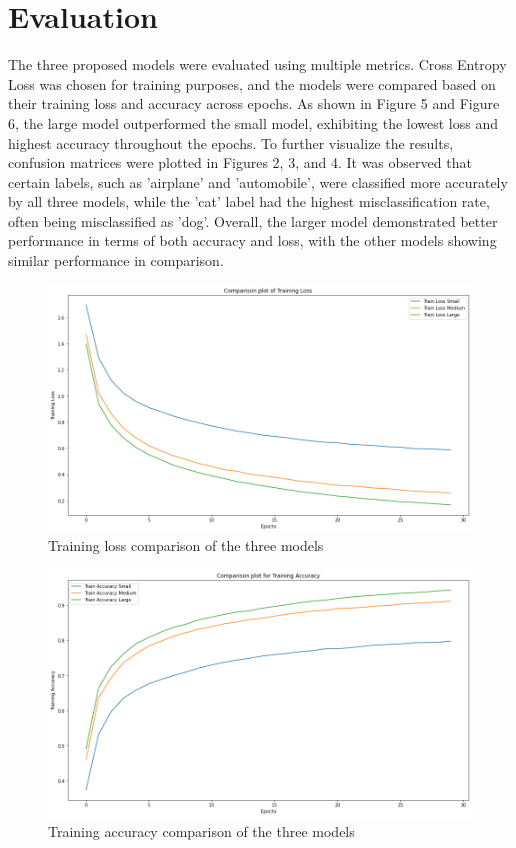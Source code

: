 \documentclass[letterpaper]{article} %
\begin{document}
\section{Evaluation}
The three proposed models were evaluated using multiple metrics. Cross Entropy Loss was chosen for training purposes, and the models were compared based on their training loss and accuracy across epochs. As shown in Figure 5 and Figure 6, the large model outperformed the small model, exhibiting the lowest loss and highest accuracy throughout the epochs. To further visualize the results, confusion matrices were plotted in Figures 2, 3, and 4. It was observed that certain labels, such as 'airplane' and 'automobile', were classified more accurately by all three models, while the 'cat' label had the highest misclassification rate, often being misclassified as 'dog'. Overall, the larger model demonstrated better performance in terms of both accuracy and loss, with the other models showing similar performance in comparison.
\begin{figure}[htbp]
\captionsetup[subfigure]{justification=centering}
  \centering
  \includegraphics[scale = 0.25]{image/train.png}
  \caption{Training loss comparison of the three models}
\end{figure}

\begin{figure}[htbp]
\captionsetup[subfigure]{justification=centering}
  \centering
  \includegraphics[scale = 0.25]{image/train_acc.png}
  \caption{Training accuracy comparison of the three models}
\end{figure}
\end{document}
